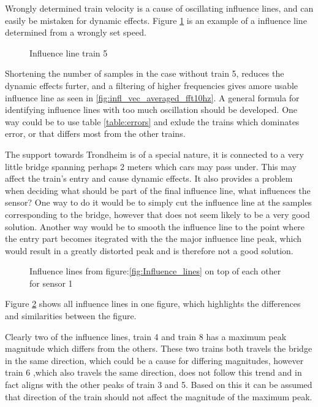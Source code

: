 Wrongly determined train velocity is a cause of oscillating influence lines, and can easily be mistaken for dynamic effects. Figure \ref{fig:train5_wrongSpeed} is an example of a influence line determined from a wrongly set speed.
\begin{figure}[H]
	\begin{adjustbox}{center}
		
	\end{adjustbox}
	\caption{Influence line train 5}
	\label{fig:train5_wrongSpeed}
\end{figure}
Shortening the number of samples in the case without train 5, reduces the dynamic effects furter, and a filtering of higher frequencies gives amore usable influence line as seen in \ref{fig:infl_vec_averaged_fft10hz}.
A general formula for identifying influence lines with too much oscillation should be developed. One way could be to use table \ref{table:errors} and exlude the trains which dominates error, or that differs most from the other trains.

The support towards Trondheim is of a special nature, it is connected to a very little bridge spanning perhaps 2 meters which cars may pass under. This may affect the train's entry and cause dynamic effects. It also provides a problem when deciding what should be part of the final influence line, what influences the sensor?
One way to do it would be to simply cut the influence line at the samples corresponding to the bridge, however that does not seem likely to be a very good solution. Another way would be to smooth the influence line to the point where the entry part becomes itegrated with the the major influence line peak, which would result in a greatly distorted peak and is therefore not a good solution.
\begin{figure}[H]
	\begin{adjustbox}{center}
		
	\end{adjustbox}
	\caption{Influence lines from figure:\ref{fig:Influence_lines} on top of each other for sensor 1}
	\label{fig:infl_all_trains}
\end{figure}

Figure \ref{fig:infl_all_trains} shows all influence lines in one figure, which highlights the differences and similarities between the figure.

Clearly two of the influence lines, train 4 and train 8 has a maximum peak magnitude which differs from the others. These two trains both travels the bridge in the same direction, which could be a cause for differing magnitudes, however train 6 ,which also travels the same direction, does not follow this trend and in fact aligns with the other peaks of train 3 and 5. Based on this it can be assumed that direction of the train should not affect the magnitude of the maximum peak.

